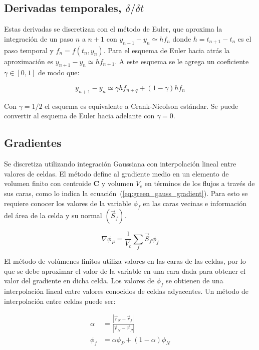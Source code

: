 \subsection{Derivadas temporales, $\delta / \delta t$}
%
Estas derivadas se discretizan con el método de Euler\parencite{burden}, que
aproxima la integración de un paso $n$ a $n+1$ con $y_{n+1}-y_{n}\simeq hf_{n}$
donde $h = t_{n+1}-t_{n}$ es el paso temporal y $f_{n}=f(t_{n},y_{n})$.
%
Para el esquema de Euler hacia atrás la aproximación es
$y_{n+1}-y_{n}\simeq h f_{n+1}$.
%
A este esquema se le agrega un coeficiente $\gamma\in[0,1]$ de modo que:

\begin{equation}
  y_{n+1}-y_{n} \simeq \gamma h f_{n+q} + (1-\gamma)h f_{n}
\end{equation}

Con $\gamma=1/2$ el esquema es equivalente a Crank-Nicolson estándar.
%
Se puede convertir al esquema de Euler hacia adelante con $\gamma=0$.

\subsection{Gradientes}
%
Se discretiza utilizando integración Gaussiana con interpolación lineal entre
valores de celdas.
%
El método define al gradiente medio en un elemento de volumen finito con
centroide \textbf{C} y volumen $V_{c}$ en términos de los flujos a través de sus
caras, como lo indica la ecuación~(\ref{eq:green_gauss_gradient}).
%
Para esto se requiere conocer los valores de la variable $\phi_{f}$ en las caras
vecinas e información del área de la celda y su normal $(\vec{S}_{f})$.

\begin{equation}
  \label{eq:green_gauss_gradient}
  \nabla \phi_{P} = \frac{1}{V_{c}}\sum_{f} \vec{S}_{f}\phi_{f}
\end{equation}

El método de volúmenes finitos utiliza valores en las caras de las celdas, por
lo que se debe aproximar el valor de la variable en una cara dada para obtener
el valor del gradiente en dicha celda.
%
Los valores de $\phi_{f}$ se obtienen de una interpolación lineal entre valores
conocidos de celdas adyacentes.
%
Un método de interpolación entre celdas puede ser:

\begin{align}
  \label{eq:interpolacion_lineal_caras}
  \alpha &= \frac{|{\vec{r}_{N}-\vec{r}_{f}}|} {|{\vec{r}_{N}-\vec{r}_{P}}|}\\
  \phi_{f} &= \alpha\phi_{P}+(1-\alpha)\phi_{N}
\end{align}


